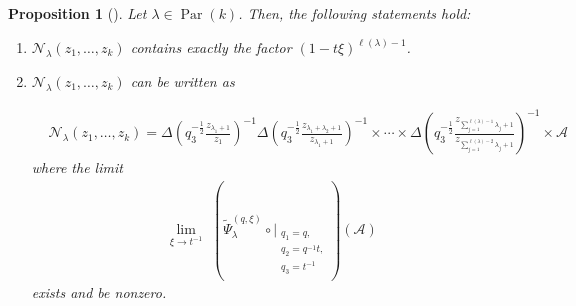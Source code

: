 \documentclass[12pt,reqno,a4paper]{amsart}
\newcommand{\comp}{\circ}
\newcommand{\cals}[1]{\mathcal{#1}}
\numberwithin{equation}{section}
\newtheorem{prop}[thm]{Proposition}
\newcommand{\dualmap}{
\widetilde{\Psi}^{(q,\xi)}_{\lambda}
}
\theoremstyle{definition}
\begin{document}
\begin{prop}[\cite{CSW2025}]\mbox{}
\label{prp-a1-1339-27jul}
Let $\lambda \in \operatorname{Par}(k)$. Then, the following statements hold:
\begin{enumerate}[(1)]
\item 
$\cals{N}_{\lambda}(z_1,\dots,z_k )$ contains exactly the factor $(1-t\xi)^{\ell(\lambda) - 1}$.
\item
$\cals{N}_{\lambda}(z_1,\dots,z_k )$ can be written as 

\footnotesize
\begin{align}
	&\cals{N}_{\lambda}(z_1,\dots,z_k )
	= 
	\Delta\left(	q_3^{-\frac{1}{2}}\frac{z_{\lambda_1 + 1}}{z_1}				\right)^{-1}
	\Delta\left(	q_3^{-\frac{1}{2}}\frac{z_{\lambda_1 + \lambda_2 + 1}}{z_{\lambda_1 + 1}}				\right)^{-1}
	\times 
	\cdots 
	\times 
	\Delta\left(	q_3^{-\frac{1}{2}}\frac{z_{\sum_{j = 1}^{\ell(\lambda) - 1}\lambda_j+1}}{z_{\sum_{j = 1}^{\ell(\lambda) - 2}\lambda_j+1}}				\right)^{-1}
	\times
	\cals{A}
	\label{d7-1950-21jan}
\end{align}
\normalsize
where the limit 
\begin{align}
	\lim_{\xi \rightarrow t^{-1}}\,\,
	(
	\dualmap
	\comp 
	\bigg|_{
		\substack{
			q_1 = q, \\
			q_2 = q^{-1}t,\\
			q_3 = t^{-1} \\
		}
	}
	)
	\left(
	\cals{A}
	\right)
\end{align}
exists and be nonzero. 
\end{enumerate}
\end{prop}
\end{document}

